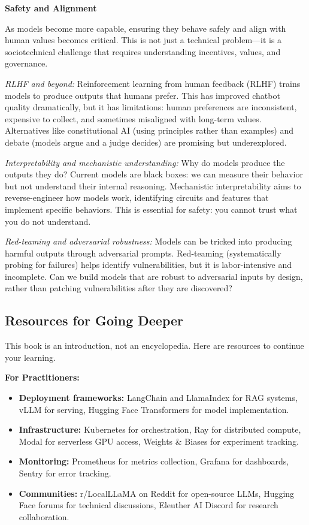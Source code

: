 \vspace{0.5em}

\textbf{Safety and Alignment}

As models become more capable, ensuring they behave safely and align with human values becomes critical. This is not just a technical problem---it is a sociotechnical challenge that requires understanding incentives, values, and governance.

\textit{RLHF and beyond:} Reinforcement learning from human feedback (RLHF) trains models to produce outputs that humans prefer. This has improved chatbot quality dramatically, but it has limitations: human preferences are inconsistent, expensive to collect, and sometimes misaligned with long-term values. Alternatives like constitutional AI (using principles rather than examples) and debate (models argue and a judge decides) are promising but underexplored.

\textit{Interpretability and mechanistic understanding:} Why do models produce the outputs they do? Current models are black boxes: we can measure their behavior but not understand their internal reasoning. Mechanistic interpretability aims to reverse-engineer how models work, identifying circuits and features that implement specific behaviors. This is essential for safety: you cannot trust what you do not understand.

\textit{Red-teaming and adversarial robustness:} Models can be tricked into producing harmful outputs through adversarial prompts. Red-teaming (systematically probing for failures) helps identify vulnerabilities, but it is labor-intensive and incomplete. Can we build models that are robust to adversarial inputs by design, rather than patching vulnerabilities after they are discovered?

\vspace{1em}

\subsection{Resources for Going Deeper}

This book is an introduction, not an encyclopedia. Here are resources to continue your learning.

\vspace{0.5em}

\textbf{For Practitioners:}

\begin{itemize}
\item \textbf{Deployment frameworks:} LangChain and LlamaIndex for RAG systems, vLLM for serving, Hugging Face Transformers for model implementation.
\item \textbf{Infrastructure:} Kubernetes for orchestration, Ray for distributed compute, Modal for serverless GPU access, Weights \& Biases for experiment tracking.
\item \textbf{Monitoring:} Prometheus for metrics collection, Grafana for dashboards, Sentry for error tracking.
\item \textbf{Communities:} r/LocalLLaMA on Reddit for open-source LLMs, Hugging Face forums for technical discussions, Eleuther AI Discord for research collaboration.
\end{itemize}

